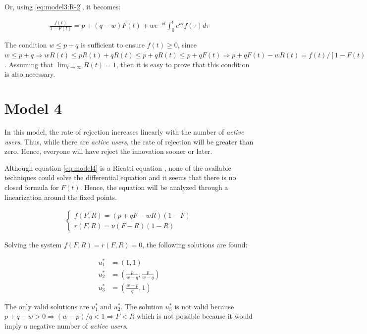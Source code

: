 Or, using \ref{eq:model3:R-2}, it becomes:

\begin{align}
\frac{f(t)}{1-F(t)} = p + (q-w)F(t) + w e^{-\nu t} \int_0^t e^{\nu \tau} f(\tau) d\tau
\end{align}

The condition $w \leq p+q$ is sufficient to ensure $f(t) \geq 0$, since $w \leq p+q \Rightarrow wR(t) \leq pR(t) + qR(t) \leq p + qR(t) \leq p + qF(t) \Rightarrow p + qF(t) - wR(t) = f(t) / [1 - F(t)] \geq 0 \Rightarrow f(t) \geq 0$. Assuming that $\lim_{t \rightarrow \infty} R(t) = 1$, then it is easy to prove that this condition is also necessary.


\section{Model 4}

In this model, the rate of rejection increases linearly with the number of \textit{active users}. Thus, while there are \textit{active users}, the rate of rejection will be greater than zero. Hence, everyone will have reject the innovation sooner or later.

Although equation \ref{eq:model4} is a Ricatti equation \citep{bittanti1991riccati}, none of the available techniques could solve the differential equation and it seems that there is no closed formula for $F(t)$. Hence, the equation will be analyzed through a linearization around the fixed points.

\begin{align}
\begin{cases}
f(F, R) = (p + qF - wR)(1 - F) \\
r(F, R) = \nu (F-R) (1-R)
\end{cases}
\end{align}

Solving the system $f(F, R) = r(F, R) = 0$, the following solutions are found:

\begin{align}
u_1^* &= (1, 1) \\
u_2^* &= \left( \frac{p}{w-q}, \frac{p}{w-q} \right) \\
u_3^* &= \left( \frac{w-p}{q}, 1 \right)
\end{align}

The only valid solutions are $u_1^*$ and $u_2^*$. The solution $u_3^*$ is not valid because $p+q-w > 0 \Rightarrow (w-p)/q < 1 \Rightarrow F < R$ which is not possible because it would imply a negative number of \textit{active users}.

